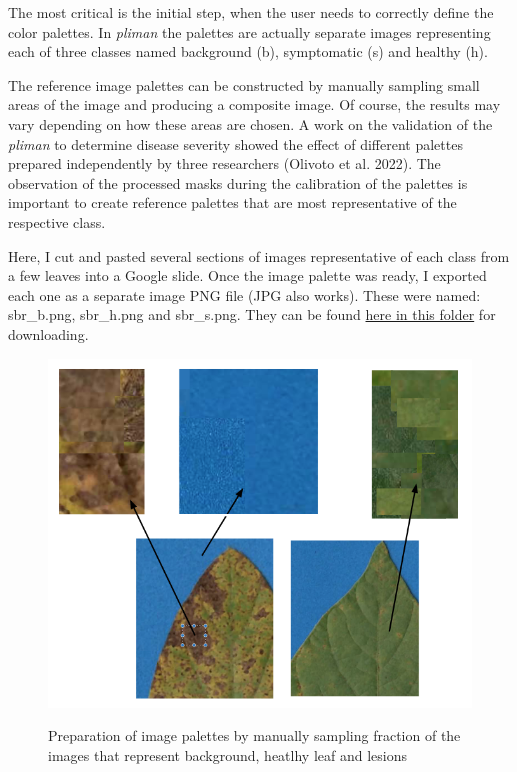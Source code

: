 \documentclass[
  letterpaper,
  DIV=11,
  numbers=noendperiod]{scrreprt}
\begin{document}
The most critical is the initial step, when the user needs to correctly
define the color palettes. In \emph{pliman} the palettes are actually
separate images representing each of three classes named background (b),
symptomatic (s) and healthy (h).

The reference image palettes can be constructed by manually sampling
small areas of the image and producing a composite image. Of course, the
results may vary depending on how these areas are chosen. A work on the
validation of the \emph{pliman} to determine disease severity showed the
effect of different palettes prepared independently by three researchers
(Olivoto et al. 2022). The observation of the processed masks during the
calibration of the palettes is important to create reference palettes
that are most representative of the respective class.

Here, I cut and pasted several sections of images representative of each
class from a few leaves into a Google slide. Once the image palette was
ready, I exported each one as a separate image PNG file (JPG also
works). These were named: sbr\_b.png, sbr\_h.png and sbr\_s.png. They
can be found
\href{https://github.com/emdelponte/epidemiology-R/tree/main/imgs}{here
in this folder} for downloading.

\begin{figure}

{\centering 

\href{Fig_palettes}{\includegraphics{./imgs/pliman1.png}}

}

\caption{Preparation of image palettes by manually sampling fraction of
the images that represent background, heatlhy leaf and lesions}

\end{figure}
\end{document}
